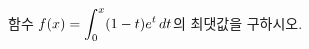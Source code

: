 \hspace*{2mm}\begin{minipage}[t]{\dimexpr\linewidth-2mm\relax}\vspace{0pt}
함수 $f(x)=\displaystyle\int_{0}^{x}(1-t)e^t\mkern3mu dt$의 최댓값을 구하시오.\end{minipage}
